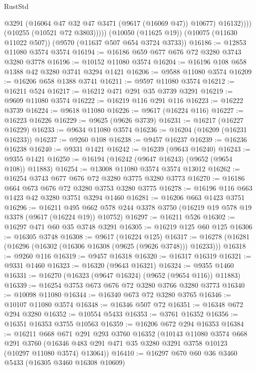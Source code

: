 \begin{lexlean}{RustStd}
\begin{coremodule}
{\begin{coremodule}
{{{{{{{{{{{{{{{{{{{{{{{{{{{{{{{{{                  @3291
                  (@16064 @47 @32 @47 @3471 (@9617 (@16069 @47)) @10677)
                  @16132))))
          (@10255 (@10521 @72 @3803)))))
    (@10050 (@11625 @19))
    (@10075 (@11630 @11022 @507))
    (@9570 (@11637 @507 @654 @3724 @3733))
@16186 := @12853 @11080 @3574 @3574
@16194 := @16186 @659 @677 @676 @72 @3280 @3743 @3280 @3778
@16196 := @10152 @11080 @3574
@16204 := @16196 @108 @658 @1388 @42 @3280 @3741 @3294 @1421
@16206 := @9588 @11080 @3574
@16209 := @16206 @658 @1388 @3741
@16211 := @9597 @11080 @3574
@16212 := @16211 @524
@16217 := @16212 @471 @291 @35 @3739 @3291
@16219 := @9609 @11080 @3574
@16222 := @16219 @116 @291 @116
@16223 := @16222 @3739
@16224 := @9618 @11080
@16226 := @9617 (@16224 @116)
@16227 := @16223 @16226
@16229 := @9625 (@9626 @3739)
@16231 := @16217 (@16227 @16229)
@16233 := @9634 @11080 @3574
@16236 := @16204 (@16209 (@16231 @16233))
@16237 := @9260 @108
@16238 := @9457 @16237
@16239 := @16236 @16238
@16240 := @9331 @1421
@16242 := @16239 (@9643 @16240)
@16243 := @9355 @1421
@16250 := @16194 (@16242 (@9647 @16243) (@9652 (@9654 @108)) @11883)
@16254 := @13008 @11080 @3574 @3574 @13012
@16262 := @16254 @3743 @677 @676 @72 @3280 @3775 @3280 @3773
@16270 := @16186 @664 @673 @676 @72 @3280 @3753 @3280 @3775
@16278 := @16196 @116 @663 @1423 @42 @3280 @3751 @3294 @1460
@16281 := @16206 @663 @1423 @3751
@16296 := @16211
    @495
    @662
    @578
    @244
    @3378
    @3750
    (@16219 @19 @578 @19 @3378 (@9617 (@16224 @19)) @10752)
@16297 := @16211 @526
@16302 := @16297 @471 @60 @35 @3748 @3291
@16305 := @16219 @125 @60 @125
@16306 := @16305 @3748
@16308 := @9617 (@16224 @125)
@16317 := @16278 (@16281 (@16296 (@16302 (@16306 @16308 (@9625 (@9626 @3748))) @16233)))
@16318 := @9260 @116
@16319 := @9457 @16318
@16320 := @16317 @16319
@16321 := @9331 @1460
@16323 := @16320 (@9643 @16321)
@16324 := @9355 @1460
@16331 := @16270 (@16323 (@9647 @16324) (@9652 (@9654 @116)) @11883)
@16339 := @16254 @3753 @673 @676 @72 @3280 @3766 @3280 @3773
@16340 := @10098 @11080
@16344 := @16340 @673 @72 @3280 @3765
@16346 := @10107 @11080 @3574
@16348 := @16346 @507 @72
@16351 := @16348 @672 @294 @3280
@16352 := @10554 @5433
@16353 := @3761 @16352
@16356 := @16351 @16353 @3755 @10563
@16359 := @16206 @672 @294 @16353
@16384 := @16211
    @668
    @671
    @291
    @293
    @3760
    @16352
    (@10143
      @11080
      @3574
      @668
      @291
      @3760
      (@16346 @483 @291 @471 @35 @3280 @3291 @3758 @10123 (@10297 @11080 @3574) @13064))
@16410 := @16297
    @670
    @60
    @36
    @3460
    @5433
    (@16305 @3460 @16308 @10609)
}}}}}}}}}}}}}}}}}}}}}}}}}}}}}}}}}
\end{coremodule}}
\end{coremodule}
\end{lexlean}
